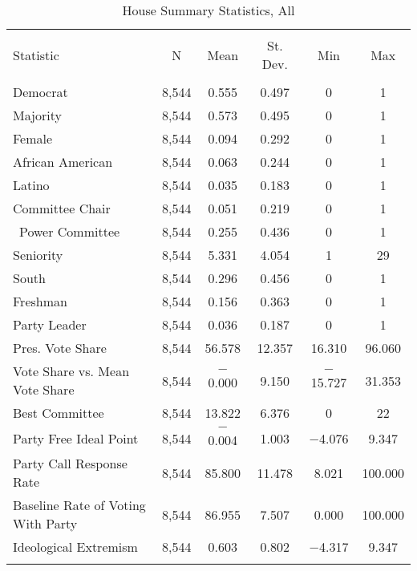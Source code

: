 \documentclass[12pt]{article}
\begin{document}
\begin{table}[!htbp] \centering 
	\caption{House Summary Statistics, All} 
	\label{} 
	\begin{tabular}{@{\extracolsep{5pt}}lccccc} 
		\\[-1.8ex]\hline 
		\hline \\[-1.8ex] 
		Statistic & \multicolumn{1}{c}{N} & \multicolumn{1}{c}{Mean} & \multicolumn{1}{c}{St. Dev.} & \multicolumn{1}{c}{Min} & \multicolumn{1}{c}{Max} \\ 
		\hline \\[-1.8ex]  
		Democrat & 8,544 & 0.555 & 0.497 & 0 & 1 \\ 
		Majority & 8,544 & 0.573 & 0.495 & 0 & 1 \\ 
		Female & 8,544 & 0.094 & 0.292 & 0 & 1 \\ 
		African American & 8,544 & 0.063 & 0.244 & 0 & 1 \\ 
		Latino & 8,544 & 0.035 & 0.183 & 0 & 1 \\ 
		Committee Chair & 8,544 & 0.051 & 0.219 & 0 & 1 \\ \ 
		Power Committee & 8,544 & 0.255 & 0.436 & 0 & 1 \\ 
		Seniority & 8,544 & 5.331 & 4.054 & 1 & 29 \\ 
		South & 8,544 & 0.296 & 0.456 & 0 & 1 \\ 
		Freshman & 8,544 & 0.156 & 0.363 & 0 & 1 \\ 
		Party Leader & 8,544 & 0.036 & 0.187 & 0 & 1 \\  
		Pres. Vote Share & 8,544 & 56.578 & 12.357 & 16.310 & 96.060 \\ 
		Vote Share vs. Mean Vote Share & 8,544 & $-$0.000 & 9.150 & $-$15.727 & 31.353 \\ 
		Best Committee & 8,544 & 13.822 & 6.376 & 0 & 22 \\ 
		Party Free Ideal Point & 8,544 & $-$0.004 & 1.003 & $-$4.076 & 9.347 \\ 
		Party Call Response Rate & 8,544 & 85.800 & 11.478 & 8.021 & 100.000 \\ 
		Baseline Rate of Voting With Party & 8,544 & 86.955 & 7.507 & 0.000 & 100.000 \\ 
		Ideological Extremism & 8,544 & 0.603 & 0.802 & $-$4.317 & 9.347 \\ 
		\hline \\[-1.8ex] 
	\end{tabular} 
\end{table} 
\end{document}
